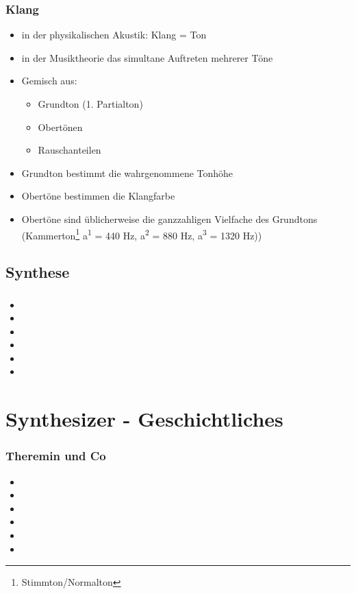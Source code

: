 \documentclass[12pt,ngerman]{beamer}
\begin{document}
\begin{frame}
\frametitle{Klang}

\begin{itemize}
\item in der physikalischen Akustik: Klang = Ton
\item in der Musiktheorie das simultane Auftreten mehrerer Töne
\item Gemisch aus:

\begin{itemize}
	\item Grundton (1. Partialton)
	\item Obertönen
	\item Rauschanteilen
	\end{itemize}

\item Grundton bestimmt die wahrgenommene Tonhöhe
\item Obertöne bestimmen die Klangfarbe
\item Obertöne sind üblicherweise die ganzzahligen Vielfache des Grundtons (Kammerton\footnote{Stimmton/Normalton} a\textsuperscript{1} = 440 Hz, a\textsuperscript{2} = 880 Hz, a\textsuperscript{3} = 1320 Hz))
\end{itemize}
\end{frame}


\subsection{Synthese}

\begin{frame}
\frametitle{}


\begin{itemize}
\item 
\item 
\item 
\item 
\item 
\item 
\end{itemize}
\end{frame}
 
\section{Synthesizer - Geschichtliches}

\begin{frame}
\frametitle{Theremin und Co}


\begin{itemize}
\item 
\item 
\item 
\item 
\item 
\item 
\end{itemize}
\end{frame} 
 
\end{document}
